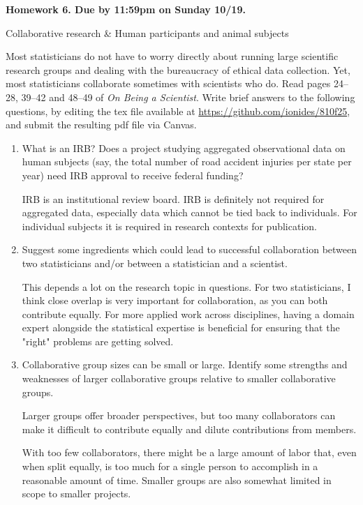 \documentclass[12pt]{article}
\begin{document}
\begin{center}\bf
Homework 6. Due by 11:59pm on Sunday 10/19.

Collaborative research \& Human participants and animal subjects

\end{center}
Most statisticians do not have to worry directly about running large scientific research groups and dealing with the bureaucracy of ethical data collection. Yet, most statisticians collaborate sometimes with scientists who do. Read pages 24--28, 39--42 and 48--49 of {\em On Being a Scientist}.  Write brief answers to the following questions, by editing the tex file available at \url{https://github.com/ionides/810f25}, and submit the resulting pdf file via Canvas.

\begin{enumerate}

\item What is an IRB? Does a project studying aggregated observational data on human subjects (say, the total number of road accident injuries per state per year) need IRB approval to receive federal funding?

IRB is an institutional review board. IRB is definitely not required for aggregated data, especially data which cannot be tied back 
to individuals. For individual subjects it is required in research contexts for publication.

\item Suggest some ingredients which could lead to successful collaboration between two statisticians and/or between a statistician and a scientist.

This depends a lot on the research topic in questions. For two statisticians, I think close overlap
is very important for collaboration, as you can both contribute equally. For more applied work across
disciplines, having a domain expert alongside the statistical expertise is beneficial for ensuring
that the "right" problems are getting solved.

\item Collaborative group sizes can be small or large. Identify some strengths and weaknesses of larger collaborative groups relative to smaller collaborative groups.

Larger groups offer broader perspectives, but too many collaborators can make it difficult to contribute equally and dilute contributions from members. 

With too few collaborators, there might be a large amount of labor that, even when split equally, is
too much for a single person to accomplish in a reasonable amount of time. Smaller groups are also 
somewhat limited in scope to smaller projects.


\end{enumerate}
\end{document}
